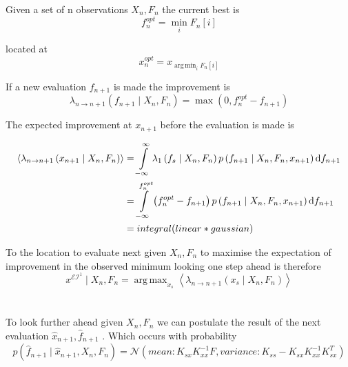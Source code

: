 \documentclass[11pt]{article}
\DeclareMathOperator*{\argmin}{arg\,min}
\DeclareMathOperator*{\argmax}{arg\,max}
\begin{document}
Given a set of n  observations $X_{n},F_{n}$ the current best is 
\begin{equation}
f_{n}^{opt}=\min_{i}F_{n}\left[i\right]
\end{equation} 

located at
\begin{equation}
x_{n}^{opt}=x_{\argmin_{i}F_{n}\left[i\right]}
\end{equation}

If a new evaluation $f_{n+1}$ is made the improvement is
\begin{equation}
\lambda_{n\rightarrow n+1}\left(f_{n+1}\mid X_{n},F_{n}\right)=\max\left(0,f_{n}^{opt}-f_{n+1}\right)
\end{equation} 

The expected improvement at $x_{n+1}$
 before the evaluation is made is
 
\begin{equation}
\begin{split}
\left\langle \lambda_{n\rightarrow n+1}\left(x_{n+1}\mid X_{n},F_{n}\right)\right\rangle 	& =\intop_{-\infty}^{\infty}\lambda_{1}\left(f_{s}\mid X_{n},F_{n}\right)p\left(f_{n+1}\mid X_{n},F_{n},x_{n+1}\right)\mathrm{d}f_{n+1} \\
	&=\intop_{-\infty}^{f_{n}^{opt}}\left(f_{n}^{opt}-f_{n+1}\right)p\left(f_{n+1}\mid X_{n},F_{n},x_{n+1}\right)\mathrm{d}f_{n+1}\\
	&=integral(linear*gaussian)\\
\end{split}
\end{equation} 

To the location to evaluate next given $ X_{n},F_{n}$  to maximise the expectation of improvement in the observed minimum looking one step ahead is therefore
\begin{equation}
x^{\mathcal{EI}^{1}}\mid X_{n},F_{n}=\argmax_{x_{s}}\left\langle \lambda_{n\rightarrow n+1}\left(x_{s}\mid X_{n},F_{n}\right)\right\rangle 
\end{equation}

\section{}
To look further ahead given $X_{n},F_{n}$  we can postulate the result of the next evaluation $\widehat{x}_{n+1}
  , \widehat{f}_{n+1}$
 . Which occurs with probability
\begin{equation}
p\left(\widehat{f}_{n+1}\mid\widehat{x}_{n+1},X_{n},F_{n}\right)=\mathcal{N}\left(mean:K_{sx}K_{xx}^{-1}F,variance:K_{ss}-K_{sx}K_{xx}^{-1}K_{sx}^{T}\right)
\end{equation}
\end{document}
